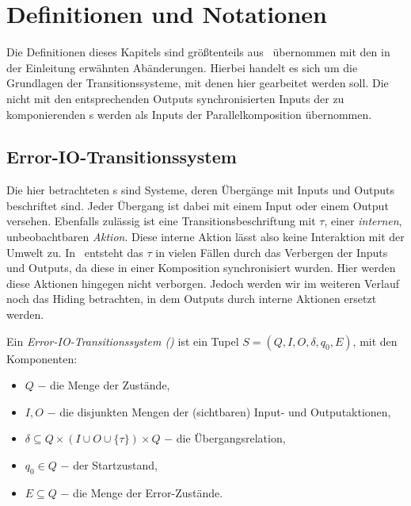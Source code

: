 \chapter{Definitionen und Notationen}

Die Definitionen dieses Kapitels sind größtenteils aus~\cite{Vogler2014EIO}
übernommen mit den in der Einleitung erwähnten Abänderungen. Hierbei handelt es
sich um die Grundlagen der Transitionssysteme, mit denen hier gearbeitet werden
soll. Die nicht mit den entsprechenden Outputs synchronisierten Inputs der zu
komponierenden \EIO{}s werden als Inputs der Parallelkomposition übernommen.

\section{Error-IO-Transitionssystem}
Die hier betrachteten \EIO{}s sind Systeme, deren Übergänge mit Inputs und
Outputs beschriftet sind. Jeder Übergang ist dabei mit einem Input oder einem
Output versehen. Ebenfalls zulässig ist eine Transitionsbeschriftung mit
$\tau$, einer \emph{internen}, unbeobachtbaren \emph{Aktion}. Diese interne
Aktion lässt also keine Interaktion mit der Umwelt zu. In~\cite{Vogler2014EIO}
entsteht das $\tau$ in vielen Fällen durch das Verbergen der Inputs und
Outputs, da diese in einer Komposition synchronisiert wurden. Hier werden diese
Aktionen hingegen nicht verborgen. Jedoch werden wir im weiteren Verlauf noch
das Hiding betrachten, in dem Outputs durch interne Aktionen ersetzt werden.

\begin{Def}
  Ein \emph{Error-IO-Transitionssystem \linebreak (\EIO{})} ist
  ein Tupel $S=(Q,I,O,\delta, q_0, E)$, mit den Komponenten:
  \begin{itemize}
    \item $Q$ $-$ die Menge der Zustände,
    \item $I,O$ $-$ die disjunkten Mengen der (sichtbaren) Input- und
      Outputaktionen,
    \item $\delta\subseteq Q\times (I\cup O\cup\{\tau\})\times Q$ $-$ die
      Übergangsrelation,
    \item $q_0\in Q$ $-$ der Startzustand,
    \item $E\subseteq Q$ $-$ die Menge der Error-Zustände.
  \end{itemize}
\end{Def}

